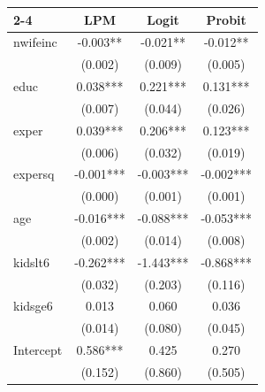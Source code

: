 \documentclass{article}
\begin{document}
\begin{center}
\begin{threeparttable}[hbtp!]
\centering
\caption{Determinants of Women's Participation in the Labor Market}
\begin{tabular}{l|ccc|}
\cline{2-4}
                                    & LPM      & Logit    & Probit   \\ \hline
\multicolumn{1}{|l|}{nwifeinc}                       & -0.003**         & -0.021**           & -0.012**  \\
\multicolumn{1}{|l|}{}            & (0.002)          & (0.009)            & (0.005)   \\
\multicolumn{1}{|l|}{educ}                           & 0.038***         & 0.221***           & 0.131***  \\
\multicolumn{1}{|l|}{}        & (0.007)          & (0.044)            & (0.026)   \\
\multicolumn{1}{|l|}{exper}                          & 0.039***         & 0.206***           & 0.123***  \\
\multicolumn{1}{|l|}{}             & (0.006)          & (0.032)            & (0.019)   \\
\multicolumn{1}{|l|}{expersq}                        & -0.001***        & -0.003***          & -0.002*** \\
\multicolumn{1}{|l|}{}                & (0.000)          & (0.001)            & (0.001)   \\
\multicolumn{1}{|l|}{age}                            & -0.016***        & -0.088***          & -0.053*** \\
\multicolumn{1}{|l|}{}              & (0.002)          & (0.014)            & (0.008)   \\
\multicolumn{1}{|l|}{kidslt6}                        & -0.262***        & -1.443***          & -0.868*** \\
\multicolumn{1}{|l|}{}              & (0.032)          & (0.203)            & (0.116)   \\
\multicolumn{1}{|l|}{kidsge6}                        & 0.013            & 0.060              & 0.036     \\
\multicolumn{1}{|l|}{}           & (0.014)          & (0.080)            & (0.045)   \\
\multicolumn{1}{|l|}{Intercept}                         & 0.586***         & 0.425              & 0.270     \\
\multicolumn{1}{|l|}{}              & (0.152)          & (0.860)            & (0.505)   \\ \hline

\end{tabular}
\end{threeparttable}
\end{center}
\end{document}
